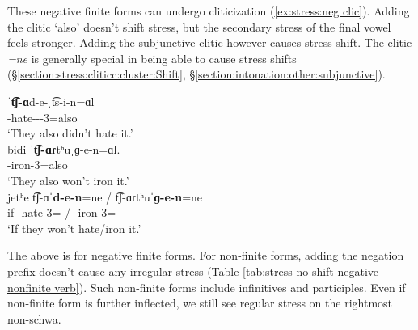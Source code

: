 These negative finite forms can undergo cliticization (\ref{ex:stress:neg clic}). Adding the clitic `also' doesn't shift stress, but the secondary stress of the final vowel feels stronger. Adding the subjunctive clitic however causes stress shift. The clitic \textit{=ne} is generally special in being able to cause stress shifts (\S\ref{section:stress:cliticc:cluster:Shift}, \S\ref{section:intonation:other:subjunctive}). 


\begin{exe}
	\ex \label{ex:stress:neg clic}
	\begin{xlist}
		\ex \gll ˈ\textbf{t͡ʃ-ɑ}d-e-ˌt͡s-i-n=ɑl 
		\\
		{\neggloss}-hate{\thgloss}-{\aorperf}-{\pst}-3{\pl}=also 
		\\ \trans `They also didn't hate it.'
		\\ 
		\ex \gll   bidi ˈ\textbf{t͡ʃ-ɑɾ}tʰuˌɡ-e-n=ɑl. 
		\\
		{\fut} {\neggloss}-iron{\thgloss}-3{\pl}=also
		\\ \trans `They also won't iron it.' 
		\\ 
		\ex \gll   jetʰe t͡ʃ-ɑˈ\textbf{d-e-n}=ne / t͡ʃ-ɑɾtʰuˈ\textbf{ɡ-e-n}=ne
		\\
		if {\neggloss}-hate{\thgloss}-3{\pl}={\sbjv} / {\neggloss}-iron{\thgloss}-3{\pl}={\sbjv}
		\\ \trans `If they  won't hate/iron it.' 
		\\ 
	\end{xlist}
\end{exe}



The above is for negative finite forms. For non-finite forms, adding the negation prefix doesn't cause any irregular stress (Table \ref{tab:stress no shift negative nonfinite verb}). Such non-finite forms include infinitives and participles. Even if  non-finite form is further inflected, we still see regular stress on the rightmost non-schwa.  

